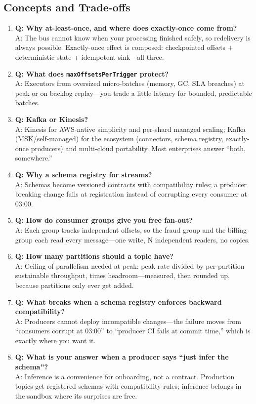 \subsection{Concepts and Trade-offs}
\begin{enumerate}
    \item \textbf{Q: Why at-least-once, and where does exactly-once come from?}\\
    A: The bus cannot know when your processing finished safely, so redelivery is always possible. Exactly-once effect is composed: checkpointed offsets + deterministic state + idempotent sink---all three.
    \item \textbf{Q: What does \texttt{maxOffsetsPerTrigger} protect?}\\
    A: Executors from oversized micro-batches (memory, GC, SLA breaches) at peak or on backlog replay---you trade a little latency for bounded, predictable batches.
    \item \textbf{Q: Kafka or Kinesis?}\\
    A: Kinesis for AWS-native simplicity and per-shard managed scaling; Kafka (MSK/self-managed) for the ecosystem (connectors, schema registry, exactly-once producers) and multi-cloud portability. Most enterprises answer ``both, somewhere.''
    \item \textbf{Q: Why a schema registry for streams?}\\
    A: Schemas become versioned contracts with compatibility rules; a producer breaking change fails at registration instead of corrupting every consumer at 03:00.
    \item \textbf{Q: How do consumer groups give you free fan-out?}\\
    A: Each group tracks independent offsets, so the fraud group and the billing group each read every message---one write, N independent readers, no copies.
    \item \textbf{Q: How many partitions should a topic have?}\\
    A: Ceiling of parallelism needed at peak: peak rate divided by per-partition sustainable throughput, times headroom---measured, then rounded up, because partitions only ever get added.
    \item \textbf{Q: What breaks when a schema registry enforces backward compatibility?}\\
    A: Producers cannot deploy incompatible changes---the failure moves from ``consumers corrupt at 03:00'' to ``producer CI fails at commit time,'' which is exactly where you want it.
    \item \textbf{Q: What is your answer when a producer says ``just infer the schema''?}\\
    A: Inference is a convenience for onboarding, not a contract. Production topics get registered schemas with compatibility rules; inference belongs in the sandbox where its surprises are free.
\end{enumerate}

